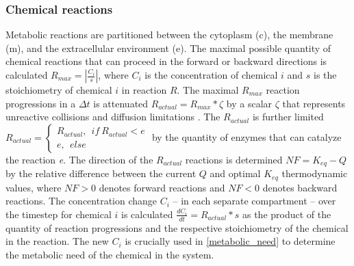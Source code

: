 \begin{supplementary}
\subsubsection{Chemical reactions}

Metabolic reactions are partitioned between the cytoplasm (c), the membrane (m), and the extracellular environment (e). The maximal possible quantity of chemical reactions that can proceed in the forward or backward directions is calculated $R_{max}=\left|\frac{C_i}{s}\right|$, where $C_i$ is the concentration of chemical $i$ and $s$ is the stoichiometry of chemical $i$ in reaction $R$. The maximal $R_{max}$ reaction progressions in a $\Delta t$ is attenuated $R_{actual}=R_{max}*\zeta$ by a scalar $\zeta$ that represents unreactive collisions and diffusion limitations \cite{Feynman1963ChapterDiffusion}. The $R_{actual}$ is further limited $R_{actual} = \begin{cases} R_{actual},~~if~R_{actual}<e \\ e,~~else \end{cases}$ by the quantity of enzymes that can catalyze the reaction \textit{e}. The direction of the $R_{actual}$ reactions is determined $NF = K_{eq}-Q$ by the relative difference between the current $Q$ and optimal $K_{eq}$ thermodynamic values, where $NF>0$ denotes forward reactions and $NF<0$ denotes backward reactions. The concentration change $C_i$ -- in each separate compartment -- over the timestep for chemical $i$ is calculated $\frac{dC_i}{dt}=R_{actual}*s$ as the product of the quantity of reaction progressions and the respective stoichiometry of the chemical in the reaction. The new $C_i$ is crucially used in \cref{metabolic_need} to determine the metabolic need of the chemical in the system. 

\end{supplementary}